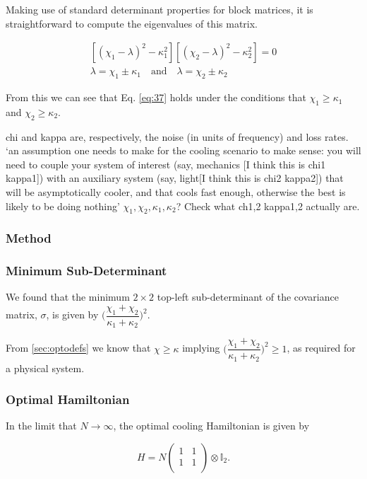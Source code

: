 \documentclass[11pt,a4paper]{article}
\numberwithin{equation}{section}
\begin{document}
	Making use of standard determinant properties for block matrices, it is straightforward to compute the eigenvalues of this matrix.
	
	\begin{align*}
	&[(\chi_1- \lambda)^2 - \kappa_1^2][(\chi_2- \lambda)^2 - \kappa_2^2]=0&\\
	&\lambda=\chi_1\pm\kappa_1 \quad\text{and}\quad \lambda=\chi_2\pm\kappa_2&
	\end{align*}
	
	From this we can see that Eq. \ref{eq:37} holds under the conditions that $\chi_1 \geq \kappa_1$ and $\chi_2 \geq \kappa_2$.
	
	chi and kappa are, respectively, the noise (in units of frequency) and loss rates. `an assumption one needs to make for the cooling scenario to make sense: you will need to couple your system of interest (say, mechanics [I think this is chi1 kappa1]) with an auxiliary system (say, light[I think this is chi2 kappa2]) that will be asymptotically cooler, and that cools fast enough, otherwise the best is likely to be doing nothing' $\chi_1, \chi_2, \kappa_1, \kappa_2$? Check what ch1,2 kappa1,2 actually are.
	
	
	\color{red}\subsubsection{Method}\color{black}

	\subsubsection{Minimum Sub-Determinant}
	We found that the minimum $2 \times 2$ top-left sub-determinant of the covariance matrix, $\sigma$, is given by $\Big(\dfrac{\chi_1 + \chi_2}{\kappa_1 + \kappa_2}\Big)^2$.  
	
	From \ref{sec:optodefs} we know that $\chi \geq \kappa$ implying $\Big(\dfrac{\chi_1 + \chi_2}{\kappa_1 + \kappa_2}\Big)^2 \geq 1$, as required for a physical system. 
	
	\subsubsection{Optimal Hamiltonian}
	
	In the limit that $N \rightarrow \infty$, the optimal cooling Hamiltonian is given by
	
	\begin{equation*}
	H = N \begin{pmatrix}
	1 & 1 \\
	1 & 1\\
	\end{pmatrix} \otimes \mathbb{I}_2.
	\end{equation*}
\end{document}
